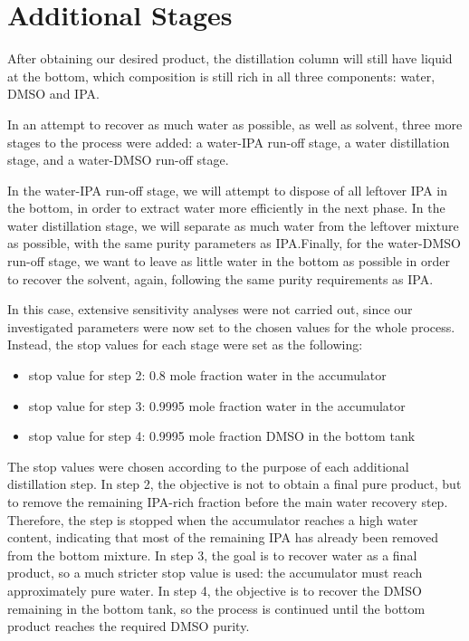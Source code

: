 \section{Additional Stages}\label{additional-stages}

After obtaining our desired product, the distillation column will still
have liquid at the bottom, which composition is still rich in all three
components: water, DMSO and IPA.

In an attempt to recover as much water as possible, as well as solvent,
three more stages to the process were added: a water-IPA run-off stage,
a water distillation stage, and a water-DMSO run-off stage.

In the water-IPA run-off stage, we will attempt to dispose of all
leftover IPA in the bottom, in order to extract water more efficiently
in the next phase. In the water distillation stage, we will separate as
much water from the leftover mixture as possible, with the same purity
parameters as IPA.Finally, for the water-DMSO run-off stage, we want to
leave as little water in the bottom as possible in order to recover the
solvent, again, following the same purity requirements as IPA.

In this case, extensive sensitivity analyses were not carried out, since
our investigated parameters were now set to the chosen values for the
whole process. Instead, the stop values for each stage were set as the
following:

\begin{itemize}
\tightlist
\item
  stop value for step 2: 0.8 mole fraction water in the accumulator
\item
  stop value for step 3: 0.9995 mole fraction water in the accumulator
\item
  stop value for step 4: 0.9995 mole fraction DMSO in the bottom tank
\end{itemize}

The stop values were chosen according to the purpose of each additional
distillation step. In step 2, the objective is not to obtain a final
pure product, but to remove the remaining IPA-rich fraction before the
main water recovery step. Therefore, the step is stopped when the
accumulator reaches a high water content, indicating that most of the
remaining IPA has already been removed from the bottom mixture. In step
3, the goal is to recover water as a final product, so a much stricter
stop value is used: the accumulator must reach approximately pure water.
In step 4, the objective is to recover the DMSO remaining in the bottom
tank, so the process is continued until the bottom product reaches the
required DMSO purity.

